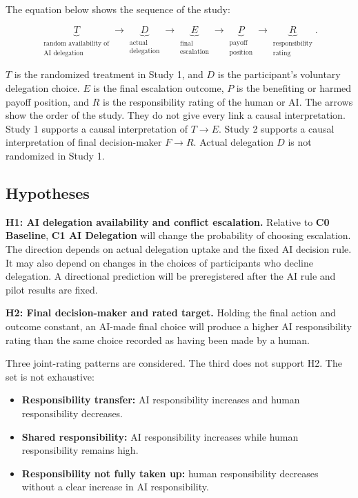 \documentclass[11pt,a4paper]{article}
\newcommand{\Baseline}{\textbf{C0 Baseline}}
\newcommand{\AID}{\textbf{C1 AI Delegation}}
\begin{document}
The equation below shows the sequence of the study:

\begin{equation*}
\underbrace{T}_{\substack{\text{random availability of}\\\text{AI delegation}}}
\longrightarrow
\underbrace{D}_{\substack{\text{actual}\\\text{delegation}}}
\longrightarrow
\underbrace{E}_{\substack{\text{final}\\\text{escalation}}}
\longrightarrow
\underbrace{P}_{\substack{\text{payoff}\\\text{position}}}
\longrightarrow
\underbrace{R}_{\substack{\text{responsibility}\\\text{rating}}}.
\end{equation*}

$T$ is the randomized treatment in Study 1, and $D$ is the participant's voluntary delegation choice. $E$ is the final escalation outcome, $P$ is the benefiting or harmed payoff position, and $R$ is the responsibility rating of the human or AI. The arrows show the order of the study. They do not give every link a causal interpretation. Study 1 supports a causal interpretation of $T\rightarrow E$. Study 2 supports a causal interpretation of final decision-maker $F\rightarrow R$. Actual delegation $D$ is not randomized in Study 1.

\subsection{Hypotheses}

\textbf{H1: AI delegation availability and conflict escalation.} Relative to \Baseline{}, \AID{} will change the probability of choosing escalation. The direction depends on actual delegation uptake and the fixed AI decision rule. It may also depend on changes in the choices of participants who decline delegation. A directional prediction will be preregistered after the AI rule and pilot results are fixed.

\textbf{H2: Final decision-maker and rated target.} Holding the final action and outcome constant, an AI-made final choice will produce a higher AI responsibility rating than the same choice recorded as having been made by a human.

Three joint-rating patterns are considered. The third does not support H2. The set is not exhaustive:

\begin{itemize}
\item \textbf{Responsibility transfer:} AI responsibility increases and human responsibility decreases.
\item \textbf{Shared responsibility:} AI responsibility increases while human responsibility remains high.
\item \textbf{Responsibility not fully taken up:} human responsibility decreases without a clear increase in AI responsibility.
\end{itemize}
\end{document}
